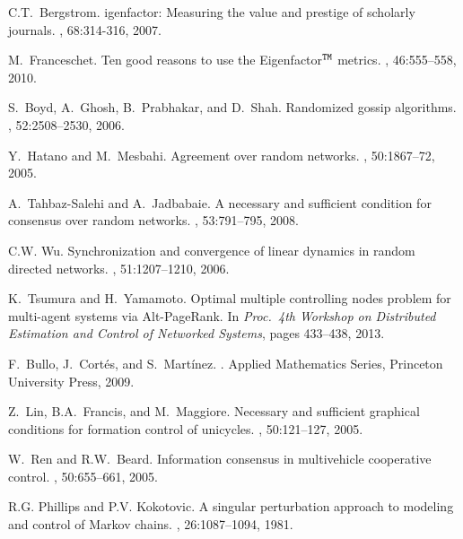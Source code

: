 \documentclass[11pt,draftcls,onecolumn]{IEEEtran}
\begin{document}
\begin{thebibliography}{1}
C.{\;}T.~Bergstrom.
igenfactor:  {M}easuring the value and prestige of scholarly journals.
, 68:314-­316, 2007.

M.~Franceschet.
\newblock Ten good reasons to use the Eigenfactor$^{\tt TM}$ metrics.
, 46:555--558, 2010.

S.~Boyd, A.~Ghosh, B.~Prabhakar, and D.~Shah.
\newblock Randomized gossip algorithms.
, 52:2508--2530, 2006.

Y.~Hatano and M.~Mesbahi.
\newblock Agreement over random networks.
, 50:1867--72, 2005.

A.~Tahbaz-Salehi and A.~Jadbabaie.
\newblock A necessary and sufficient condition for consensus over random
  networks.
, 53:791--795, 2008.

C.{\;}W. Wu.
\newblock Synchronization and convergence of linear dynamics in random directed
  networks.
, 51:1207--1210, 2006.

K.~Tsumura and H.~Yamamoto.
\newblock Optimal multiple controlling nodes problem 
for multi-agent systems via Alt-PageRank.
\newblock In {\em Proc.\ {\rm 4}th Workshop on Distributed Estimation and 
Control of Networked Systems}, pages 433--438, 2013.



F.~Bullo, J.~Cort\'{e}s, and S.\ Mart\'{i}nez.
.
\newblock Applied Mathematics Series,
Princeton University Press, 2009.

Z.~Lin, B.{\;}A.~Francis, and M.~Maggiore. 
\newblock Necessary and sufficient graphical conditions for formation control 
of unicycles. 
, 50:121--127, 2005.

W.~Ren and R.{\;}W.~Beard. 
\newblock Information consensus in multivehicle cooperative control. 
, 50:655--661, 2005.


R.{\;}G. Phillips and P.{\;}V. Kokotovic.
\newblock A singular perturbation approach to modeling and control of {M}arkov
  chains.
, 26:1087--1094, 1981.


\end{thebibliography}
\end{document}
